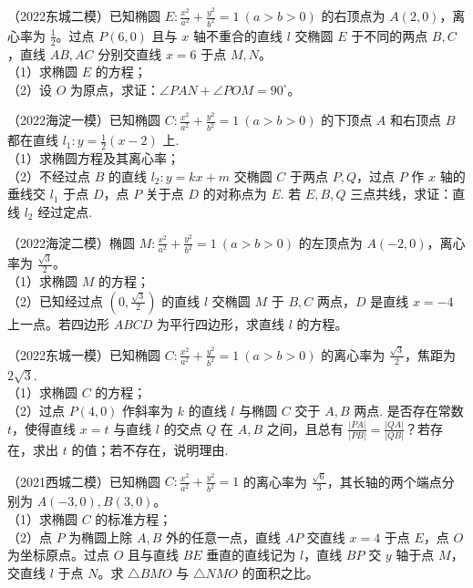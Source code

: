 \begin{exercise} %
（2022东城二模）已知椭圆 $E:\frac{x^2}{a^2}+\frac{y^2}{b^2}=1\ (a>b>0)$ 的右顶点为 $A(2,0)$，离心率为 $\frac{1}{2}$。过点 $P(6,0)$ 且与 $x$ 轴不重合的直线 $l$ 交椭圆 $E$ 于不同的两点 $B,C$，直线 $AB,AC$ 分别交直线 $x=6$ 于点 $M,N$。\\
（1）求椭圆 $E$ 的方程；\\
（2）设 $O$ 为原点，求证：$\angle PAN+\angle POM=90^\circ$。
\end{exercise}

\begin{exercise} %
（2022海淀一模）已知椭圆 $C:\frac{x^2}{a^2}+\frac{y^2}{b^2}=1\ (a>b>0)$ 的下顶点 $A$ 和右顶点 $B$ 都在直线 $l_1:y=\frac{1}{2}(x-2)$ 上.\\
（1）求椭圆方程及其离心率；\\
（2）不经过点 $B$ 的直线 $l_2:y=kx+m$ 交椭圆 $C$ 于两点 $P,Q$，过点 $P$ 作 $x$ 轴的垂线交 $l_1$ 于点 $D$，点 $P$ 关于点 $D$ 的对称点为 $E$. 若 $E,B,Q$ 三点共线，求证：直线 $l_2$ 经过定点.
\end{exercise}

\begin{exercise} %
（2022海淀二模）椭圆 $M:\frac{x^2}{a^2}+\frac{y^2}{b^2}=1\ (a>b>0)$ 的左顶点为 $A(-2,0)$，离心率为 $\frac{\sqrt{3}}{2}$。\\
（1）求椭圆 $M$ 的方程；\\
（2）已知经过点 $\left(0,\frac{\sqrt{3}}{2}\right)$ 的直线 $l$ 交椭圆 $M$ 于 $B,C$ 两点，$D$ 是直线 $x=-4$ 上一点。若四边形 $ABCD$ 为平行四边形，求直线 $l$ 的方程。
\end{exercise}

\begin{exercise} %
（2022东城一模）已知椭圆 $C:\frac{x^2}{a^2}+\frac{y^2}{b^2}=1\ (a>b>0)$ 的离心率为 $\frac{\sqrt{3}}{2}$，焦距为 $2\sqrt{3}$.\\
（1）求椭圆 $C$ 的方程；\\
（2）过点 $P(4,0)$ 作斜率为 $k$ 的直线 $l$ 与椭圆 $C$ 交于 $A,B$ 两点. 是否存在常数 $t$，使得直线 $x=t$ 与直线 $l$ 的交点 $Q$ 在 $A,B$ 之间，且总有 $\frac{\lvert PA\rvert}{\lvert PB\rvert}=\frac{\lvert QA\rvert}{\lvert QB\rvert}$？若存在，求出 $t$ 的值；若不存在，说明理由.
\end{exercise}

\begin{exercise} %
（2021西城二模）已知椭圆 $C:\frac{x^2}{a^2}+\frac{y^2}{b^2}=1$ 的离心率为 $\frac{\sqrt{6}}{3}$，其长轴的两个端点分别为 $A(-3,0),B(3,0)$。\\
（1）求椭圆 $C$ 的标准方程；\\
（2）点 $P$ 为椭圆上除 $A,B$ 外的任意一点，直线 $AP$ 交直线 $x=4$ 于点 $E$，点 $O$ 为坐标原点。过点 $O$ 且与直线 $BE$ 垂直的直线记为 $l$，直线 $BP$ 交 $y$ 轴于点 $M$，交直线 $l$ 于点 $N$。求 $\triangle BMO$ 与 $\triangle NMO$ 的面积之比。
\end{exercise}

